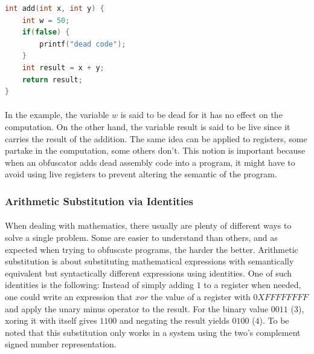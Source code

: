\begin{lstlisting}[caption={Example of function with dead code.}, label={lst:dead_code_insertion}, frame=tlrb, language={c++}]
int add(int x, int y) {
	int w = 50;
	if(false) {
		printf("dead code");
	}
	int result = x + y;
	return result;
}
\end{lstlisting}

\paragraph{}
In the example, the variable $w$ is said to be dead for it has no effect on the computation. On the other hand, the variable result is said to be live since it carries the result of the addition. The same idea can be applied to registers, some partake in the computation, some others don't. This notion is important because when an obfuscator adds dead assembly code into a program, it might have to avoid using live registers to prevent altering the semantic of the program.

\subsubsection{Arithmetic Substitution via Identities} \label{sec:arithmetic_substitution_via_identities}
\paragraph{}
When dealing with mathematics, there usually are plenty of different ways to solve a single problem. Some are easier to understand than others, and as expected when trying to obfuscate programs, the harder the better. Arithmetic substitution is about substituting mathematical expressions with semantically equivalent but syntactically different expressions using identities. One of such identities is the following: Instead of simply adding $1$ to a register when needed, one could write an expression that $xor$ the value of a register with $0XFFFFFFFF$ and apply the unary minus operator to the result. For the binary value $0011$ ($3$), xoring it with itself gives $1100$ and negating the result yields $0100$ ($4$). To be noted that this substitution only works in a system using the two's complement signed number representation.


